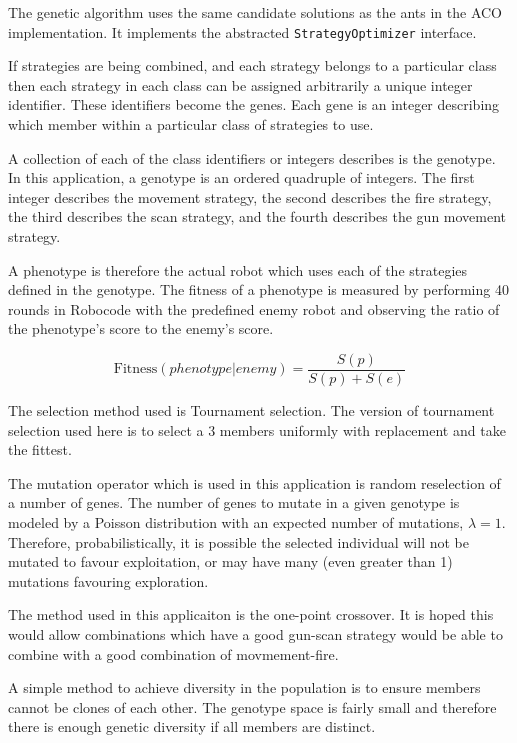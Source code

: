 The genetic algorithm uses the same candidate solutions as the ants in the ACO implementation. It implements the abstracted \texttt{StrategyOptimizer} interface.

If strategies are being combined, and each strategy belongs to a particular class then each strategy in each class can be assigned arbitrarily a unique integer identifier. These identifiers become the genes. Each gene is an integer describing which member within a particular class of strategies to use.

A collection of each of the class identifiers or integers describes is the genotype. In this application, a genotype is an ordered quadruple of integers. The first integer describes the movement strategy, the second describes the fire strategy, the third describes the scan strategy, and the fourth describes the gun movement strategy.

A phenotype is therefore the actual robot which uses each of the strategies defined in the genotype. The fitness of a phenotype is measured by performing 40 rounds in Robocode with the predefined enemy robot and observing the ratio of the phenotype's score to the enemy's score.

\begin{equation}
\label{eqn:fitness}
\text{Fitness}\left({phenotype}|{enemy}\right) = 
\frac{S(p)}{S(p) + S(e)}
\end{equation}

The selection method used is Tournament selection. The version of tournament selection used here is to select a 3 members uniformly with replacement and take the fittest.

The mutation operator which is used in this application is random reselection of a number of genes. The number of genes to mutate in a given genotype is modeled by a Poisson distribution with an expected number of mutations, $\lambda = 1$. Therefore, probabilistically, it is possible the selected individual will not be mutated to favour exploitation, or may have many (even greater than 1)  mutations favouring exploration.

The method used in this applicaiton is the one-point crossover. It is hoped this would allow combinations which have a good gun-scan strategy would be able to combine with a good combination of movmement-fire.

A simple method to achieve diversity in the population is to ensure members cannot be clones of each other. The genotype space is fairly small and therefore there is enough genetic diversity if all members are distinct.
